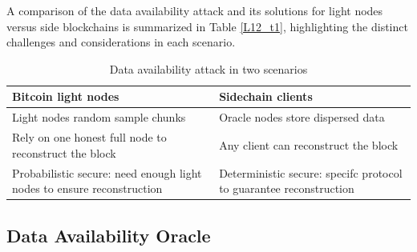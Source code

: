 A comparison of the data availability attack and its solutions for light nodes versus side blockchains is summarized in Table \ref{L12_t1}, highlighting the distinct challenges and considerations in each scenario.
\begin{table}[htbp]
	\centering
	\captionsetup{justification=centering}
	\caption[position=above]{Data availability attack in two scenarios}
	\begin{tabular}{|>{\centering\arraybackslash}p{8cm}|>{\centering\arraybackslash}p{8cm}|}
		\hline
		Bitcoin light nodes & Sidechain clients\\
		\hline
		Light nodes random sample chunks & Oracle nodes store dispersed data \\
		\hline
		Rely on one honest full node to	reconstruct the block & Any client can reconstruct the block \\
		\hline
		Probabilistic secure: need enough light nodes to ensure reconstruction & Deterministic secure: specifc protocol to guarantee reconstruction \\
		\hline
	\end{tabular}
	\label{table:L12_t1}
\end{table}
\subsection{Data Availability Oracle}

